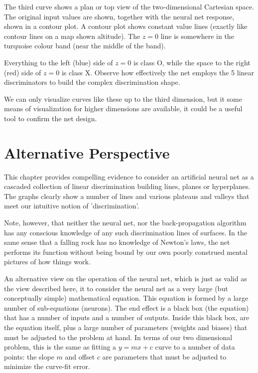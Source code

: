 The third curve shows a plan or top view of the two-dimensional Cartesian space.   The original input values are shown, together with the neural net response, shown in a contour plot.  A contour plot shows constant value lines (exactly like contour lines on a map shown altitude).  The $z=0$  line is somewhere in the turquoise colour band (near the middle of the band).  

Everything to the left (blue) side of $z=0$  is class O,  while the space to the right (red) side of $z=0$  is class X.  Observe how effectively the net employs the 5 linear discriminators to build the complex discrimination shape.  

We can only visualize curves like these up to the third dimension, but it some means of visualization for higher dimensions are available, it could be a useful tool to confirm the net design.

\FloatBarrier
\section{Alternative Perspective}

This chapter provides compelling evidence to consider an artificial  neural net as a cascaded collection of linear discrimination building lines, planes or hyperplanes.  The graphs clearly show a number of lines and various plateaus and valleys that meet our intuitive notion of 'discrimination'.

Note, however, that neither the neural net, nor the back-propagation algorithm has any conscious knowledge of any such discrimination lines of surfaces.  In the same sense that a falling rock has no knowledge of Newton's laws, the net performs its function without being bound by our own poorly construed mental pictures of how things work.

An alternative view on the operation of the neural net, which is just as valid as the  view described here, it to consider the neural net as a very large (but conceptually simple) mathematical equation.  This equation is formed by a large number of sub-equations (neurons).  The end effect is a black box (the equation) that has a number of inputs and a number of outputs.  Inside this black box, are the equation itself, plus a large number of parameters (weights and biases) that must be adjusted to the problem at hand.  In terms of our two dimensional problem, this is the same as fitting a $y=mx+c$ curve to a number of data points: the slope $m$ and offset $c$ are parameters that must be adjusted to minimize the curve-fit error.  

